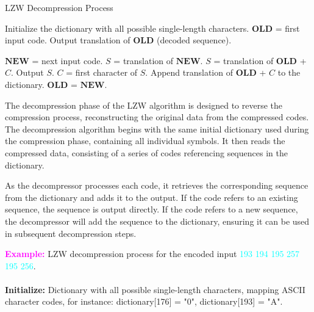 \begin{algorithm}[H]
	\caption{LZW Decompression Process} 
	\begin{algorithmic}[1]
        \State Initialize the dictionary with all possible single-length characters.
        \State $\textbf{OLD}$ = first input code.
        \State Output translation of $\textbf{OLD}$ (decoded sequence).
        
            \State $\textbf{NEW}$ = next input code.
                \State $S$ = translation of $\textbf{NEW}$.
            \Else
                \State $S$ = translation of $ \textbf{OLD}$ + $C$.
            \EndIf
            \State Output $S$.
            \State $C$ = first character of $S$.
            \State Append translation of $\textbf{OLD}$ + $C$ to the dictionary.
            \State $\textbf{OLD}$ = $\textbf{NEW}$.
        \EndWhile
	\end{algorithmic} 
\end{algorithm}

\vspace{10pt}

The decompression phase of the LZW algorithm is designed to reverse the compression process, reconstructing the original data from the compressed codes. The decompression algorithm begins with the same initial dictionary used during the compression phase, containing all individual symbols. It then reads the compressed data, consisting of a series of codes referencing sequences in the dictionary.

\vspace{10pt}

As the decompressor processes each code, it retrieves the corresponding sequence from the dictionary and adds it to the output. If the code refers to an existing sequence, the sequence is output directly. If the code refers to a new sequence, the decompressor will add the sequence to the dictionary, ensuring it can be used in subsequent decompression steps.

\vspace{10pt}
\textcolor{magenta}{\textbf{Example:}} LZW decompression process for the encoded input \textcolor{cyan}{193 194 195 257 195 256}.\\ \\
\textbf{Initialize:} Dictionary with all possible single-length characters, mapping ASCII character codes, for instance: dictionary[176] = "0", dictionary[193] = "A".

